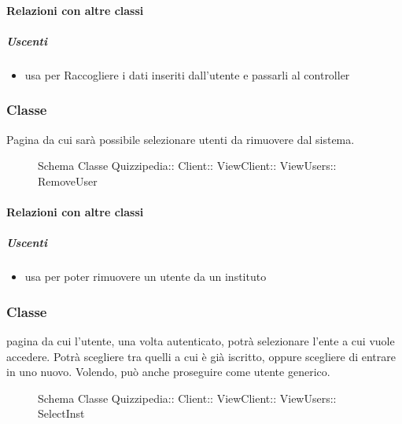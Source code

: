 \paragraph{Relazioni con altre classi}
\subparagraph{Uscenti}
\begin{itemize}
\item usa  per Raccogliere i dati inseriti dall'utente e passarli al controller
\end{itemize}
\subsubsection{Classe }
Pagina da cui sarà possibile selezionare utenti da rimuovere dal sistema.
\begin{figure}[H]
\centering
\noindent{}
\caption[Schema Classe RemoveUser]{Schema Classe Quizzipedia:: Client:: ViewClient:: ViewUsers:: RemoveUser}
\end{figure}
\paragraph{Relazioni con altre classi}
\subparagraph{Uscenti}
\begin{itemize}
\item usa  per poter rimuovere un utente da un instituto
\end{itemize}
\subsubsection{Classe }
pagina da cui l'utente, una volta autenticato, potrà selezionare l'ente a cui vuole accedere. Potrà scegliere tra quelli a cui è già iscritto, oppure scegliere di entrare in uno nuovo. Volendo, può anche proseguire come utente generico.
\begin{figure}[H]
\centering
\noindent{}
\caption[Schema Classe SelectInst]{Schema Classe Quizzipedia:: Client:: ViewClient:: ViewUsers:: SelectInst}
\end{figure}
